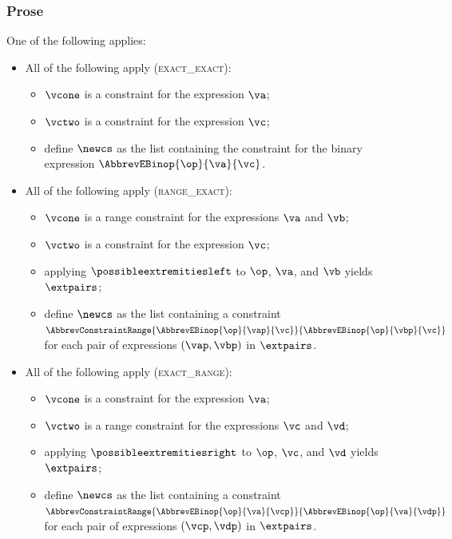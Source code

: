 \subsubsection{Prose}
One of the following applies:
\begin{itemize}
  \item All of the following apply (\textsc{exact\_exact}):
  \begin{itemize}
    \item $\vcone$ is a constraint for the expression $\va$;
    \item $\vctwo$ is a constraint for the expression $\vc$;
    \item define $\newcs$ as the list containing the constraint for the binary expression $\AbbrevEBinop{\op}{\va}{\vc}$.
  \end{itemize}

  \item All of the following apply (\textsc{range\_exact}):
  \begin{itemize}
    \item $\vcone$ is a range constraint for the expressions $\va$ and $\vb$;
    \item $\vctwo$ is a constraint for the expression $\vc$;
    \item applying $\possibleextremitiesleft$ to $\op$, $\va$, and $\vb$ yields $\extpairs$;
    \item define $\newcs$ as the list containing a constraint $\AbbrevConstraintRange{\AbbrevEBinop{\op}{\vap}{\vc}}{\AbbrevEBinop{\op}{\vbp}{\vc}}$
          for each pair of expressions $(\vap, \vbp)$ in $\extpairs$.
  \end{itemize}

  \item All of the following apply (\textsc{exact\_range}):
  \begin{itemize}
    \item $\vcone$ is a constraint for the expression $\va$;
    \item $\vctwo$ is a range constraint for the expressions $\vc$ and $\vd$;
    \item applying $\possibleextremitiesright$ to $\op$, $\vc$, and $\vd$ yields $\extpairs$;
    \item define $\newcs$ as the list containing a constraint $\AbbrevConstraintRange{\AbbrevEBinop{\op}{\va}{\vcp}}{\AbbrevEBinop{\op}{\va}{\vdp}}$
          for each pair of expressions $(\vcp, \vdp)$ in $\extpairs$.
  \end{itemize}


\end{itemize}
